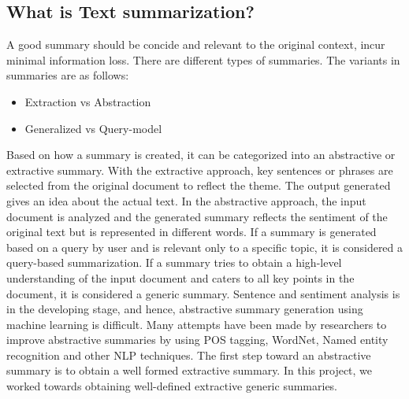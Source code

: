 \subsection{What is Text summarization?}
A good summary should be concide and relevant to the original context, incur minimal information loss.
There are different types of summaries. The variants in summaries are as follows:
\begin{itemize}
\item Extraction vs Abstraction
\item Generalized vs Query-model
\end{itemize}
Based on how a summary is created, it can be categorized into an abstractive or extractive summary.
With the extractive approach, key sentences or phrases are selected from the original document to reflect the theme.
The output generated gives an idea about the actual text. In the abstractive approach, the input document is
analyzed and the generated summary reflects the sentiment of the original text but is represented in different words.\newline
If a summary is generated based on a query by user and is relevant only to a specific topic, it is considered a 
query-based summarization. If a summary tries to obtain a high-level understanding of the input document and 
caters to all key points in the document, it is considered a generic summary.\newline
Sentence and sentiment analysis is in the developing stage, and hence, abstractive summary generation using machine learning
is difficult. Many attempts have been made by researchers to improve abstractive summaries by using 
POS tagging, WordNet, Named entity recognition and other NLP techniques. The first step toward an abstractive summary is to obtain
a well formed extractive summary. In this project, we worked towards obtaining well-defined extractive generic summaries.

